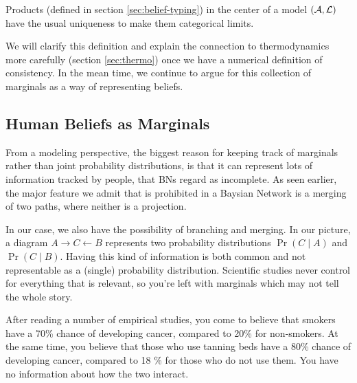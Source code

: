 \documentclass{article}
\begin{document}
	\begin{coro}
		Products (defined in section \ref{sec:belief-typing}) in the center of a model $(\cal A, L)$ have the usual uniqueness to make them categorical limits.
	\end{coro}

	We will clarify this definition and explain the connection to thermodynamics more carefully (section \ref{sec:thermo}) once we have a numerical definition of consistency. In the mean time, we continue to argue for this collection of marginals as a way of representing beliefs.

	
	
	\subsection{Human Beliefs as Marginals}\label{sec:human-belief-marginals}
	From a modeling perspective, the biggest reason for keeping track of marginals rather than joint probability distributions, is that it can represent lots of information tracked by people, that BNs regard as incomplete. As seen earlier, the major feature we admit that is prohibited in a Baysian Network is a merging of two paths, where neither is a projection.
	
	In our case, we also have the possibility of branching and merging. In our picture, a diagram $A \rightarrow C \leftarrow B$ represents two probability distributions $\Pr(C\mid A)$ and $\Pr(C \mid B)$.
	Having this kind of information is both common and not representable as a (single) probability distribution. Scientific studies never control for everything that is relevant, so you're left with marginals which may not tell the whole story.
	
	\begin{example}
		After reading a number of empirical studies, you come to believe that smokers have a 70\% chance of developing cancer, compared to 20\% for non-smokers. At the same time, you believe that those who use tanning beds have a 80\% chance of developing cancer, compared to 18 \% for those who do not use them. You have no information about how the two interact.
	\end{example}
	
\end{document}
